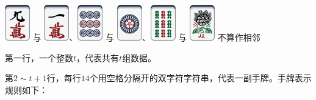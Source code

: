 \documentclass[
    lang=cn,
    color=green
]{elegantbook}
\begin{document}
{\begin{remark}
\begin{itemize}
                  \includegraphics[scale=0.5]{images/mahjong/9m.png} 与 \includegraphics[scale=0.5]{images/mahjong/1m.png}、\includegraphics[scale=0.5]{images/mahjong/9p.png} 与 \includegraphics[scale=0.5]{images/mahjong/1p.png}、\includegraphics[scale=0.5]{images/mahjong/9s.png} 与 \includegraphics[scale=0.5]{images/mahjong/1s.png} 不算作相邻
        \end{itemize}

    \end{remark}


}{
    第一行，一个整数$t$，代表共有$t$组数据。

    第$2 \sim t+1$行，每行$14$个用空格分隔开的双字符字符串，代表一副手牌。手牌表示规则如下：

}
\end{document}
